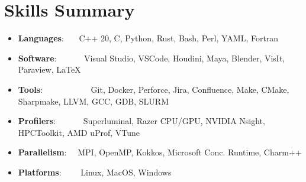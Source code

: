 \documentclass[a4paper,20pt]{article}
\newcommand{\resumeSubItem}[2]{
  \item{
    \textbf{#1}{: #2 \vspace{-2pt}}
  }
  \vspace{-3pt}
}
\newcommand{\resumeSubHeadingListStart}{\begin{itemize}[leftmargin=*,label={}]}
\newcommand{\resumeSubHeadingListEnd}{\end{itemize}}
\begin{document}
\vspace{5pt}
\section{Skills Summary}
	\resumeSubHeadingListStart
	\resumeSubItem{Languages}{~~~C++ 20, C, Python, Rust, Bash, Perl, YAML, Fortran}
	\resumeSubItem{Software}{~~~~~~Visual Studio, VSCode, Houdini, Maya, Blender, VisIt, Paraview, 
	\LaTeX}
	\resumeSubItem{Tools}{~~~~~~~~~~~Git, Docker, Perforce, Jira, Confluence, Make,
	CMake, Sharpmake, LLVM, GCC, GDB, SLURM}
	\resumeSubItem{Profilers}{~~~~~~Superluminal, Razer CPU/GPU, NVIDIA Nsight,
	HPCToolkit, AMD uProf, VTune}
  \resumeSubItem{Parallelism}{~~MPI, OpenMP, Kokkos, Microsoft Conc. Runtime, Charm++}
	\resumeSubItem{Platforms}{~~~~Linux, MacOS, Windows}
\resumeSubHeadingListEnd

\vspace{5pt}
\end{document}
